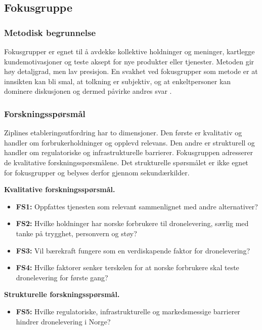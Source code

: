 \subsection{Fokusgruppe}
\label{app:fokusgruppe}

\subsubsection*{Metodisk begrunnelse}

Fokusgrupper er egnet til å avdekke kollektive holdninger og meninger,
kartlegge kundemotivasjoner og teste aksept for nye produkter eller tjenester.
Metoden gir høy detaljgrad, men lav presisjon. En svakhet ved fokusgrupper
som metode er at innsikten kan bli smal, at tolkning er subjektiv, og at
enkeltpersoner kan dominere diskusjonen og dermed påvirke andres svar
\parencite[Forelesning 7]{aspelund2026_forelesninger}.

\subsubsection*{Forskningsspørsmål}

Ziplines etableringsutfordring har to dimensjoner. Den første er kvalitativ og
handler om forbrukerholdninger og opplevd relevans. Den andre er strukturell
og handler om regulatoriske og infrastrukturelle barrierer. Fokusgruppen
adresserer de kvalitative forskningsspørsmålene. Det strukturelle
spørsmålet er ikke egnet for fokusgrupper og belyses derfor gjennom
sekundærkilder.

\textbf{Kvalitative forskningsspørsmål.}
\begin{itemize}[leftmargin=1.5em, nosep]
  \item \textbf{FS1:} Oppfattes tjenesten som relevant sammenlignet med
  andre alternativer?
  \item \textbf{FS2:} Hvilke holdninger har norske forbrukere til
  dronelevering, særlig med tanke på trygghet, personvern og støy?
  \item \textbf{FS3:} Vil bærekraft fungere som en verdiskapende faktor for
  dronelevering?
  \item \textbf{FS4:} Hvilke faktorer senker terskelen for at norske forbrukere
  skal teste dronelevering for første gang?
\end{itemize}

\textbf{Strukturelle forskningsspørsmål.}
\begin{itemize}[leftmargin=1.5em, nosep]
  \item \textbf{FS5:} Hvilke regulatoriske, infrastrukturelle og
  markedsmessige barrierer hindrer dronelevering i Norge?
\end{itemize}

